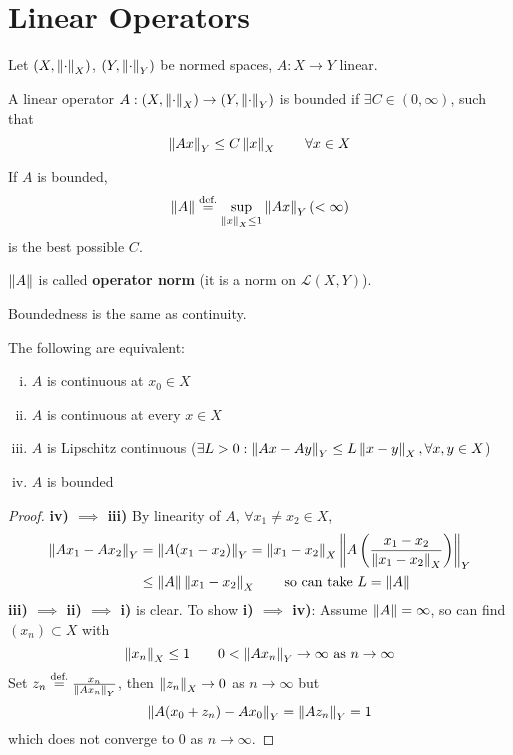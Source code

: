 \documentclass{article}
\begin{document}
\section{Linear Operators}  
Let $(X, \left\|{\cdot}\right\|_X)$, $(Y, \left\|{\cdot}\right\|_Y)$ be normed spaces, $A: X \to Y$ linear.  

\begin{definition}\nl
\label{bounded operator def}
    A linear operator $A: (X, \left\|{\cdot}\right\|_X) \to (Y, \left\|{\cdot}\right\|_Y)$ is bounded if $\exists C \in (0, \infty)$, such that  
    $$
    \left\|{Ax}\right\|_Y \leq C \left\|{x}\right\|_X \qquad \forall x \in X
    $$
\end{definition}

If $A$ is bounded, 
$$
\left\|{A}\right\| \stackrel{\text{def.}}{=} \sup_{\left\|{x}\right\|_X\leq 1} \left\|{Ax}\right\|_Y (<\infty)
$$
is the best possible $C$.  

$\left\|{A}\right\|$ is called \textbf{operator norm} (it is a norm on $\mathcal{L}(X,Y)$).  

Boundedness is the same as continuity.  

\begin{theorem}
\label{equivalent defn of bounded operators}
    The following are equivalent:  
    \begin{enumerate}[i)]
        \item $A$ is continuous at $x_0\in X$
        \item $A$ is continuous at every $x \in X$
        \item $A$ is Lipschitz continuous ($\exists L > 0: \left\|{Ax-Ay}\right\|_Y \leq L \left\|{x-y}\right\|_X, \forall x,y\in X$)
        \item $A$ is bounded
    \end{enumerate}
\end{theorem}
\begin{proof}
    \textbf{iv) $\implies$ iii)}\nl
    By linearity of $A$, $\forall x_1\neq x_2 \in X$,  
    \begin{align*}
        \norm{Ax_1 - Ax_2}_Y &= \norm{A(x_1-x_2)}_Y = \norm{x_1-x_2}_X \norm{A \left(\frac{x_1-x_2}{\norm{x_1-x_2}_X}\right)}_Y \\
        &\leq \norm{A} \norm{x_1-x_2}_X \qquad \text{so\ can\ take\ } L = \norm{A}
    \end{align*}
    \textbf{iii) $\implies$ ii) $\implies$ i)} is clear.  
    To show \textbf{i) $\implies$ iv)}:\nl
    Assume $\left\|{A}\right\|=\infty$, so can find $(x_n) \subset X$ with  
    $$
    \left\|{x_n}\right\|_X \leq 1 \qquad 0 < \left\|{Ax_n}\right\|_Y \to \infty \text{\ as\ } n\to \infty
    $$
    Set $z_n \stackrel{\text{def.}}{=} \frac{x_n}{\left\|{Ax_n}\right\|_Y}$,  then $\left\|{z_n}\right\|_X \to 0$ as $n\to \infty$ but 
    $$
    \left\|{A(x_0+z_n)-Ax_0}\right\|_Y = \left\|{Az_n}\right\|_Y = 1
    $$
    which does not converge to $0$ as $n\to \infty$.
\end{proof}
\end{document}
